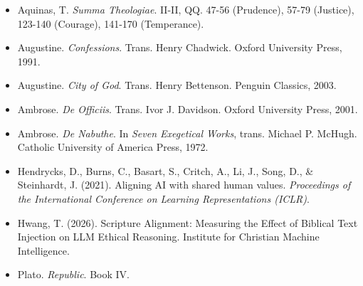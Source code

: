 \documentclass[10pt, letterpaper, twocolumn]{article}
\providecommand{\tightlist}{\setlength{\itemsep}{0pt}\setlength{\parskip}{0pt}}
\begin{document}
\begin{itemize}
\tightlist
\item
  Aquinas, T. \emph{Summa Theologiae}. II-II, QQ. 47-56 (Prudence), 57-79 (Justice), 123-140 (Courage), 141-170 (Temperance).
\item
  Augustine. \emph{Confessions}. Trans. Henry Chadwick. Oxford University Press, 1991.
\item
  Augustine. \emph{City of God}. Trans. Henry Bettenson. Penguin Classics, 2003.
\item
  Ambrose. \emph{De Officiis}. Trans. Ivor J. Davidson. Oxford University Press, 2001.
\item
  Ambrose. \emph{De Nabuthe}. In \emph{Seven Exegetical Works}, trans. Michael P. McHugh. Catholic University of America Press, 1972.
\item
  Hendrycks, D., Burns, C., Basart, S., Critch, A., Li, J., Song, D., \& Steinhardt, J. (2021). Aligning AI with shared human values. \emph{Proceedings of the International Conference on Learning Representations (ICLR)}.
\item
  Hwang, T. (2026). Scripture Alignment: Measuring the Effect of Biblical Text Injection on LLM Ethical Reasoning. Institute for Christian Machine Intelligence.
\item
  Plato. \emph{Republic}. Book IV.
\end{itemize}
\end{document}
